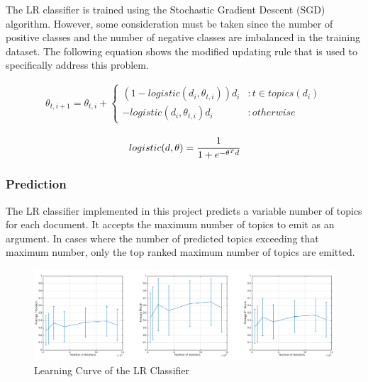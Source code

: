 \documentclass[11pt]{article}
\begin{document}
The LR classifier is trained using the Stochastic Gradient Descent (SGD) algorithm. 
However, some consideration must be taken since the number of positive classes and the number of negative classes are imbalanced in the training dataset.
The following equation shows the modified updating rule that is used to specifically address this problem.

\begin{equation}
    \label{eq:lr-update}
    \begin{split}
        \theta_{t, i+1} = \theta_{t, i} + \left\{
            \begin{array}{lr}
                (1 - logistic(d_i, \theta_{t, i})) d_i & : t\in topics(d_i) \\
                - logistic(d_i, \theta_{t, i}) d_i & : otherwise
            \end{array}
        \right.
    \end{split}
\end{equation}

\begin{equation}
    \label{eq:lr-logistic}
    \begin{split}
        logistic(d, \theta) = \cfrac{1}{1 + e^{-\theta^T d}}
    \end{split}
\end{equation}

\subsubsection*{Prediction}
The LR classifier implemented in this project predicts a variable number of topics for each document. It accepts the maximum number of topics to emit as an argument. 
In cases where the number of predicted topics exceeding that maximum number, only the top ranked maximum number of topics are emitted.

\begin{figure}[b]
\centering
    \centering
    \includegraphics[width=1\textwidth]{lr-num-of-iterations.png}
    \caption{Learning Curve of the LR Classifier}
    \label{fig:lr-num-of-iterations}
\end{figure}
\end{document}
